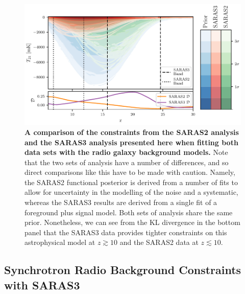 \begin{figure}[ht!]
    \centering
    \includegraphics{saras3/figs/FigureS2.pdf}
    \caption{\textbf{A comparison of the constraints from the SARAS2 analysis \cite{Bevins_SARAS2_2022} and the SARAS3 analysis presented here when fitting both data sets with the radio galaxy background models.} Note that the two sets of analysis have a number of differences, and so direct comparisons like this have to be made with caution. Namely, the SARAS2 functional posterior is derived from a number of fits to allow for uncertainty in the modelling of the noise and a systematic, whereas the SARAS3 results are derived from a single fit of a foreground plus signal model. Both sets of analysis share the same prior. Nonetheless, we can see from the KL divergence in the bottom panel that the SARAS3 data provides tighter constraints on this astrophysical model at $z \gtrsim 10$ and the SARAS2 data at $z \lesssim 10$.}
    \label{fig:saras2_saras3_comparison}
\end{figure}

\subsection{Synchrotron Radio Background Constraints with SARAS3}
\label{synchRB}

